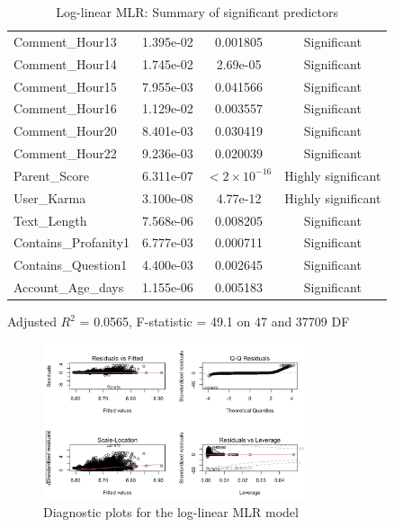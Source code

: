 \documentclass[10pt]{article}
\begin{document}
\begin{table}[H]
\begin{tabular}{lccc}
Comment\_Hour13                  & 1.395e-02  & 0.001805  & Significant \\
Comment\_Hour14                  & 1.745e-02  & 2.69e-05  & Significant \\
Comment\_Hour15                  & 7.955e-03  & 0.041566  & Significant \\
Comment\_Hour16                  & 1.129e-02  & 0.003557  & Significant \\
Comment\_Hour20                  & 8.401e-03  & 0.030419  & Significant \\
Comment\_Hour22                  & 9.236e-03  & 0.020039  & Significant \\
Parent\_Score                    & 6.311e-07  & $<2\times10^{-16}$ & Highly significant \\
User\_Karma                      & 3.100e-08  & 4.77e-12  & Highly significant \\
Text\_Length                     & 7.568e-06  & 0.008205  & Significant \\
Contains\_Profanity1             & 6.777e-03  & 0.000711  & Significant \\
Contains\_Question1              & 4.400e-03  & 0.002645  & Significant \\
Account\_Age\_days               & 1.155e-06  & 0.005183  & Significant \\
\bottomrule
\end{tabular}

\bigskip
\noindent Adjusted \(R^2\) = 0.0565, F-statistic = 49.1 on 47 and 37709 DF

\caption{Log-linear MLR: Summary of significant predictors}
\label{tab:mlr_results}
\end{table}

\begin{figure}[H]
    \centering
    \includegraphics[width=0.7\textwidth]{pictures/log_mlr_plots.png}
    \caption{Diagnostic plots for the log-linear MLR model}
    \label{fig:log_mlr_plots}
\end{figure}
\end{document}
